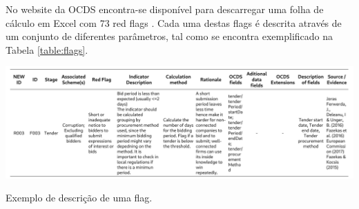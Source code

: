 
No website da OCDS encontra-se disponível para descarregar uma folha de cálculo em Excel com 73 red flags \cite{spreadsheet1} \cite{spreadsheet}. Cada uma destas flags é descrita através de um conjunto de diferentes parâmetros, tal como se encontra exemplificado na Tabela \ref{table:flags}.

\begin{table}[H]
	\centering
	\includegraphics[width=\textwidth]{imagens/tabela_flags.png}
	\caption{Exemplo de descrição de uma flag.}
	\label{table:flags}
\end{table}








